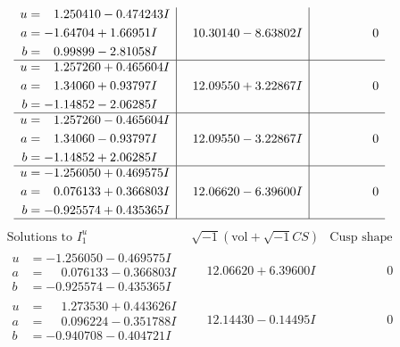 \documentclass[1p]{elsarticle_modified}
\theoremstyle{definition}
\newcommand{\I}{\sqrt{-1}}
\begin{document}
$$\begin{array}{c|c|c}
\begin{aligned}
u &= \phantom{-}1.250410 - 0.474243 I \\
a &= -1.64704 + 1.66951 I \\
b &= \phantom{-}0.99899 - 2.81058 I\end{aligned}
 & \phantom{-}10.30140 - 8.63802 I & \phantom{-0.000000 } 0 \\ \hline\begin{aligned}
u &= \phantom{-}1.257260 + 0.465604 I \\
a &= \phantom{-}1.34060 + 0.93797 I \\
b &= -1.14852 - 2.06285 I\end{aligned}
 & \phantom{-}12.09550 + 3.22867 I & \phantom{-0.000000 } 0 \\ \hline\begin{aligned}
u &= \phantom{-}1.257260 - 0.465604 I \\
a &= \phantom{-}1.34060 - 0.93797 I \\
b &= -1.14852 + 2.06285 I\end{aligned}
 & \phantom{-}12.09550 - 3.22867 I & \phantom{-0.000000 } 0 \\ \hline\begin{aligned}
u &= -1.256050 + 0.469575 I \\
a &= \phantom{-}0.076133 + 0.366803 I \\
b &= -0.925574 + 0.435365 I\end{aligned}
 & \phantom{-}12.06620 - 6.39600 I & \phantom{-0.000000 } 0\\
 \hline 
 \end{array}$$\newpage$$\begin{array}{c|c|c}  
\text{Solutions to }I^u_{1}& \I (\text{vol} + \sqrt{-1}CS) & \text{Cusp shape}\\
 \hline 
\begin{aligned}
u &= -1.256050 - 0.469575 I \\
a &= \phantom{-}0.076133 - 0.366803 I \\
b &= -0.925574 - 0.435365 I\end{aligned}
 & \phantom{-}12.06620 + 6.39600 I & \phantom{-0.000000 } 0 \\ \hline\begin{aligned}
u &= \phantom{-}1.273530 + 0.443626 I \\
a &= \phantom{-}0.096224 - 0.351788 I \\
b &= -0.940708 - 0.404721 I\end{aligned}
 & \phantom{-}12.14430 - 0.14495 I & \phantom{-0.000000 } 0 \\ \hline\begin{aligned}

\end{aligned}
\end{array}$$
\end{document}
